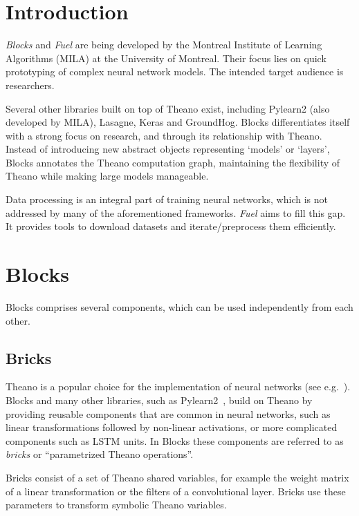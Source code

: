 \documentclass[twoside,11pt]{article}
\begin{document}
\section{Introduction}

\emph{Blocks} and \emph{Fuel} are being developed by the Montreal Institute of
Learning Algorithms (MILA) at the University of Montreal. Their focus lies on
quick prototyping of complex neural network models. The intended target
audience is researchers.

Several other libraries built on top of Theano exist, including Pylearn2 (also
developed by MILA), Lasagne, Keras and GroundHog. Blocks differentiates itself
with a strong focus on research, and through its relationship with Theano.
Instead of introducing new abstract objects representing `models' or `layers',
Blocks annotates the Theano computation graph, maintaining the flexibility of
Theano while making large models manageable.

Data processing is an integral part of training neural networks, which is not
addressed by many of the aforementioned frameworks. \emph{Fuel} aims to fill
this gap. It provides tools to download datasets and iterate/preprocess them
efficiently.

\section{Blocks}

Blocks comprises several components, which can be used independently from each
other.

\subsection{Bricks}

Theano is a popular choice for the implementation of neural networks (see
e.g.~\cite{Goodfellow-et-al-ICML2013, Pascanu-et-al-ICML2013}). Blocks and many
other libraries, such as Pylearn2~\citep{pylearn2_arxiv_2013}, build on Theano
by providing reusable components that are common in neural networks, such as
linear transformations followed by non-linear activations, or more complicated
components such as LSTM units. In Blocks these components are referred to as
\emph{bricks} or ``parametrized Theano operations''.

Bricks consist of a set of Theano shared variables, for example the weight
matrix of a linear transformation or the filters of a convolutional layer.
Bricks use these parameters to transform symbolic Theano variables.
\end{document}
